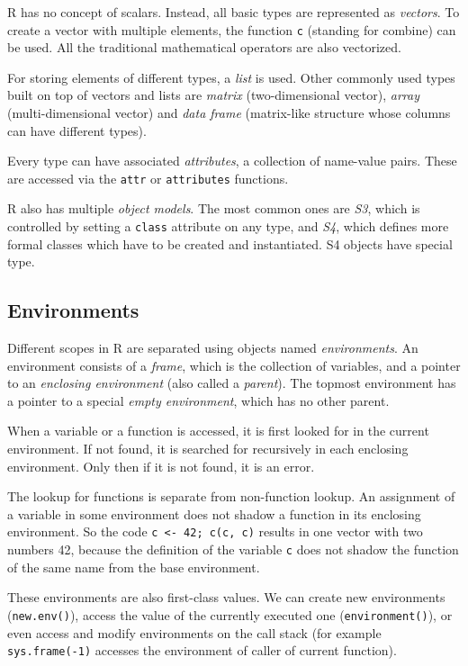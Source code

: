 R has no concept of scalars. Instead, all basic types are represented as \textit{vectors}. To create a vector with multiple elements, the function \texttt{c} (standing for combine) can be used. All the traditional mathematical operators are also vectorized.

For storing elements of different types, a \textit{list} is used. Other commonly used types built on top of vectors and lists are \textit{matrix} (two-dimensional vector), \textit{array} (multi-dimensional vector) and \textit{data frame} (matrix-like structure whose columns can have different types).

Every type can have associated \textit{attributes}, a collection of name-value pairs. These are accessed via the \texttt{attr} or \texttt{attributes} functions.

R also has multiple \textit{object models}. The most common ones are \textit{S3}, which is controlled by setting a \texttt{class} attribute on any type, and \textit{S4}, which defines more formal classes which have to be created and instantiated. S4 objects have special type.

\subsection*{Environments}

Different scopes in R are separated using objects named \textit{environments}. An environment consists of a \textit{frame}, which is the collection of variables, and a pointer to an \textit{enclosing environment} (also called a \textit{parent}). The topmost environment has a pointer to a special \textit{empty environment}, which has no other parent.

When a variable or a function is accessed, it is first looked for in the current environment. If not found, it is searched for recursively in each enclosing environment. Only then if it is not found, it is an error.

The lookup for functions is separate from non-function lookup. An assignment of a variable in some environment does not shadow a function in its enclosing environment. So the code \texttt{c <- 42; c(c, c)} results in one vector with two numbers 42, because the definition of the variable \texttt{c} does not shadow the function of the same name from the base environment.

These environments are also first-class values. We can create new environments (\texttt{new.env()}), access the value of the currently executed one (\texttt{environment()}), or even access and modify environments on the call stack (for example \texttt{sys.frame(-1)} accesses the environment of caller of current function).

